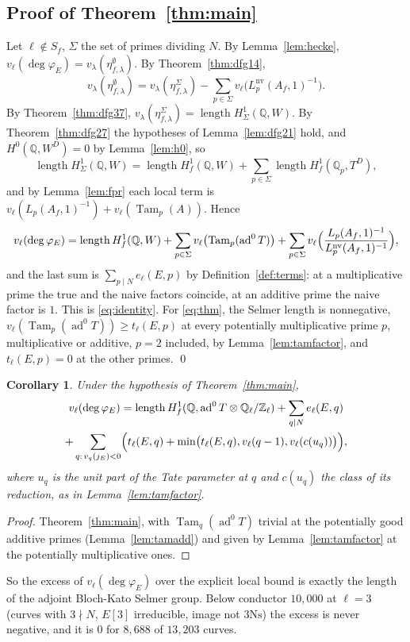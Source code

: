 \documentclass[11pt]{amsart}
\newtheorem{corollary}[theorem]{Corollary}
\theoremstyle{definition}
\newcommand{\Q}{\mathbb{Q}}
\newcommand{\Z}{\mathbb{Z}}
\newcommand{\degphi}{\deg\varphi_E}
\newcommand{\ad}{\operatorname{ad}^0}
\newcommand{\nv}{\mathrm{nv}}
\newcommand{\Tam}{\operatorname{Tam}}
\newcommand{\len}{\operatorname{length}}
\newcommand{\Ns}{3\mathrm{Ns}}
\begin{document}
\subsection{Proof of Theorem~\ref{thm:main}}
Let $\ell\notin S_f$, $\Sigma$ the set of primes dividing $N$. By Lemma~\ref{lem:hecke}, $v_\ell(\degphi)=v_\lambda(\eta^\emptyset_{f,\lambda})$. By Theorem~\ref{thm:dfg14},
\[
v_\lambda(\eta^\emptyset_{f,\lambda})=v_\lambda(\eta^\Sigma_{f,\lambda})-\sum_{p\in\Sigma}v_\ell\bigl(L_p^{\nv}(A_f,1)^{-1}\bigr).
\]
By Theorem~\ref{thm:dfg37}, $v_\lambda(\eta^\Sigma_{f,\lambda})=\len H^1_\Sigma(\Q,W)$. By Theorem~\ref{thm:dfg27} the hypotheses of Lemma~\ref{lem:dfg21} hold, and $H^0(\Q,W^D)=0$ by Lemma~\ref{lem:h0}, so
\[
\len H^1_\Sigma(\Q,W)=\len H^1_f(\Q,W)+\sum_{p\in\Sigma}\len H^1_f(\Q_p,T^D),
\]
and by Lemma~\ref{lem:fpr} each local term is $v_\ell(L_p(A_f,1)^{-1})+v_\ell(\Tam_p(A))$. Hence
\[
v_\ell(\degphi)=\len H^1_f(\Q,W)+\sum_{p\in\Sigma}v_\ell\bigl(\Tam_p(\ad T)\bigr)+\sum_{p\in\Sigma}v_\ell\Bigl(\frac{L_p(A_f,1)^{-1}}{L^{\nv}_p(A_f,1)^{-1}}\Bigr),
\]
and the last sum is $\sum_{p\mid N}e_\ell(E,p)$ by Definition~\ref{def:terms}: at a multiplicative prime the true and the naive factors coincide, at an additive prime the naive factor is $1$. This is \eqref{eq:identity}. For \eqref{eq:thm}, the Selmer length is nonnegative, $v_\ell(\Tam_p(\ad T))\ge t_\ell(E,p)$ at every potentially multiplicative prime $p$, multiplicative or additive, $p=2$ included, by Lemma~\ref{lem:tamfactor}, and $t_\ell(E,p)=0$ at the other primes. \qed

\begin{corollary}\label{cor:explicit}
Under the hypothesis of Theorem~\ref{thm:main},
\begin{multline*}
v_\ell(\degphi)=\len H^1_f(\Q,\ad T\otimes\Q_\ell/\Z_\ell)+\sum_{q\mid N}e_\ell(E,q)\\
+\sum_{q:\,v_q(j_E)<0}\Bigl(t_\ell(E,q)+\min\bigl(t_\ell(E,q),v_\ell(q-1),v_\ell(c(u_q))\bigr)\Bigr),
\end{multline*}
where $u_q$ is the unit part of the Tate parameter at $q$ and $c(u_q)$ the class of its reduction, as in Lemma~\ref{lem:tamfactor}.
\end{corollary}
\begin{proof}
Theorem~\ref{thm:main}, with $\Tam_q(\ad T)$ trivial at the potentially good additive primes (Lemma~\ref{lem:tamadd}) and given by Lemma~\ref{lem:tamfactor} at the potentially multiplicative ones.
\end{proof}

So the excess of $v_\ell(\degphi)$ over the explicit local bound is exactly the length of the adjoint Bloch-Kato Selmer group. Below conductor $10{,}000$ at $\ell=3$ (curves with $3\nmid N$, $E[3]$ irreducible, image not $\Ns$) the excess is never negative, and it is $0$ for $8{,}688$ of $13{,}203$ curves.
\end{document}

